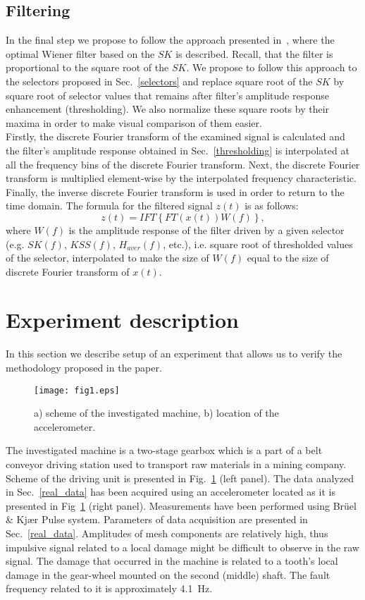 \documentclass[11pt]{article} %
\begin{document}
\subsection{Filtering}
In the final step we propose to follow the approach presented in~\cite{CombetSK}, where the optimal Wiener filter based on the $SK$ is described. Recall, that the filter is proportional to the square root of the $SK$. We propose to follow this approach to the selectors proposed in Sec.~\ref{selectors} and replace square root of the $SK$ by square root of selector values that remains after filter's amplitude response enhancement (thresholding). We also normalize these square roots by their maxima in order to make visual comparison of them easier.\\
Firstly, the discrete Fourier transform of the examined signal is calculated and the filter's amplitude response obtained in Sec.~\ref{thresholding} is interpolated at all the frequency bins of the discrete Fourier transform. Next, the discrete Fourier transform is multiplied element-wise by the interpolated frequency characteristic. Finally, the inverse discrete Fourier transform is used in order to return to the time domain. The formula for the filtered signal $z(t)$ is as follows:
\begin{equation}
z(t)=IFT\left\{{FT\left(x(t)\right)}{W(f)}\right\},
\end{equation}
where $W(f)$ is the amplitude response of the filter driven by a given selector (e.g. $SK(f)$, $KSS(f)$, $H_{aver}(f)$, etc.), i.e. square root of thresholded values of the selector, interpolated to make the size of $W(f)$ equal to the size of discrete Fourier transform of $x(t)$.
\section{Experiment description}\label{experiment}
In this section we describe setup of an experiment that allows us to verify the methodology proposed in the paper.
\begin{figure}[!ht]
\begin{center}
\texttt{[image: fig1.eps]}
\caption{a) scheme of the investigated machine, b) location of the accelerometer.}\label{gearbox}
\end{center}
\end{figure}
The investigated machine is a two-stage gearbox which is a part of a belt conveyor driving station used to transport raw materials in a mining company. Scheme of the driving unit is presented in Fig.~\ref{gearbox} (left panel). The data analyzed in Sec.~\ref{real_data} has been acquired using an accelerometer located as it is presented in Fig~\ref{gearbox} (right panel). Measurements have been performed using Br{\"u}el \& Kj{\ae}r Pulse system. Parameters of data acquisition are presented in Sec.~\ref{real_data}. Amplitudes of mesh components are relatively high, thus impulsive signal related to a local damage might be difficult to observe in the raw signal. The damage that occurred in the machine is related to a tooth's local damage in the gear-wheel mounted on the second (middle) shaft. The fault frequency related to it is approximately 4.1~Hz.
\end{document}
